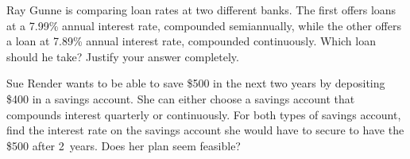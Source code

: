 \documentclass[11pt,letterpaper]{article}
\begin{document}
\newpage



 Ray Gunne is comparing loan rates at two different banks. The first offers loans at a 7.99\% annual interest rate, compounded semiannually, while the other offers a loan at 7.89\% annual interest rate, compounded continuously. Which loan should he take? Justify your answer completely.



\newpage



 Sue Render wants to be able to save \$500 in the next two years by depositing \$400 in a savings account. She can either choose a savings account that compounds interest quarterly or continuously. For both types of savings account, find the interest rate on the savings account she would have to secure to have the \$500 after 2~years. Does her plan seem feasible? 
\end{document}
